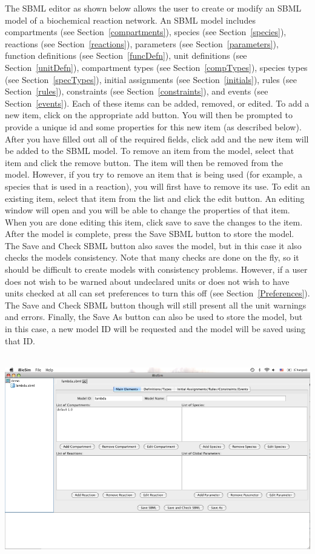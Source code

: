 \documentclass[titlepage,11pt]{article}
\begin{document}
\noindent
The SBML editor as shown below allows the user to create or modify an SBML
model of a biochemical reaction network.  An SBML model includes
compartments (see Section~\ref{compartments}), 
species (see Section~\ref{species}),
reactions (see Section~\ref{reactions}), 
parameters (see Section~\ref{parameters}),
function definitions (see Section~\ref{funcDefn}), 
unit definitions (see Section~\ref{unitDefn}), 
compartment types (see Section~\ref{compTypes}), 
species types (see Section~\ref{specTypes}),
initial assignments (see Section~\ref{initials}), 
rules (see Section~\ref{rules}), 
constraints (see Section~\ref{constraints}), and
events (see Section~\ref{events}).
Each of these items can be added, removed, or edited. 
To add a new item, click on the appropriate add button. You
will then be prompted to provide a unique id and some properties
for this new item (as described below). After you have filled out
all of the required fields, click add and the new item will be
added to the SBML model.
To remove an item from the model, select that item and click
the remove button. The item will then be removed from the model.
However, if you try to remove an item that is being used 
(for example, a species that is used in a reaction), you will first have 
to remove its use.
To edit an existing item, select that item from the list and
click the edit button. An editing window will open and you will
be able to change the properties of that item. When you are done
editing this item, click save to save the changes to the item. 
After the model is complete, press the Save SBML button to store
the model.  The Save and Check SBML button also saves the model, but
in this case it also checks the models consistency.
Note that many checks are done on the fly, so it should be difficult
to create models with consistency problems.  However, if a user does
not wish to be warned about undeclared units or does not wish to have
units checked at all can set preferences to turn this off
(see Section~\ref{Preferences}).  The Save and Check SBML button
though will still present all the unit warnings and errors.
Finally, the Save As button can also be used to store the
model, but in this case, a new model ID will be requested and the
model will be saved using that ID. 
\begin{center}
\includegraphics[height=90mm]{screenshots/SBMLedit}
\end{center}
\end{document}
